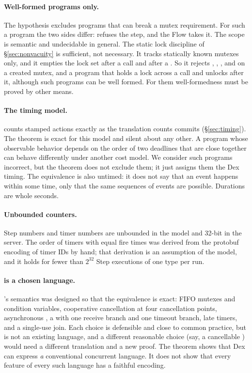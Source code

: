 \paragraph{Well-formed programs only.}
The hypothesis  excludes programs that can break
a mutex requirement. For such a program the two sides differ: \Lang{}
refuses the step, and the Flow takes it. The scope is semantic and
undecidable in general. The static lock discipline of
\S\ref{sec:nonvacuity} is sufficient, not necessary. It tracks statically
known mutexes only, and it empties the lock set after a call and after a
. So it rejects , , , and
 on a created mutex, and a program that holds a lock across a
call and unlocks after it, although such programs can be well formed. For
them well-formedness must be proved by other means.

\paragraph{The timing model.}
\Lang{} counts stamped actions exactly as the translation counts commits
(\S\ref{sec:timing}). The theorem is exact for this model and silent about
any other. A program whose observable behavior depends on the order of two
deadlines that are close together can behave differently under another cost
model. We consider such programs incorrect, but the theorem does not
exclude them; it just assigns them the Dex timing. The equivalence is also
untimed: it does not say that an event happens within some time, only that
the same sequences of events are possible. Durations are whole seconds.

\paragraph{Unbounded counters.}
Step numbers and timer numbers are unbounded in the model and 32-bit in the
server. The order of timers with equal fire times was derived from the
protobuf encoding of timer IDs by hand; that derivation is an assumption of
the model, and it holds for fewer than $2^{32}$ Step executions of one type
per run.

\paragraph{\Lang{} is a chosen language.}
\Lang{}'s semantics was designed so that the equivalence is exact: FIFO
mutexes and condition variables, cooperative cancellation at four
cancellation points, asynchronous , a  with one receive
branch and one timeout branch, late timers, and a single-use join. Each
choice is defensible and close to common practice, but \Lang{} is not an
existing language, and a different reasonable choice (say, a cancellable
) would need a different translation and a new proof. The theorem
shows that Dex can express \emph{a} conventional concurrent language. It
does not show that every feature of every such language has a faithful
encoding.

